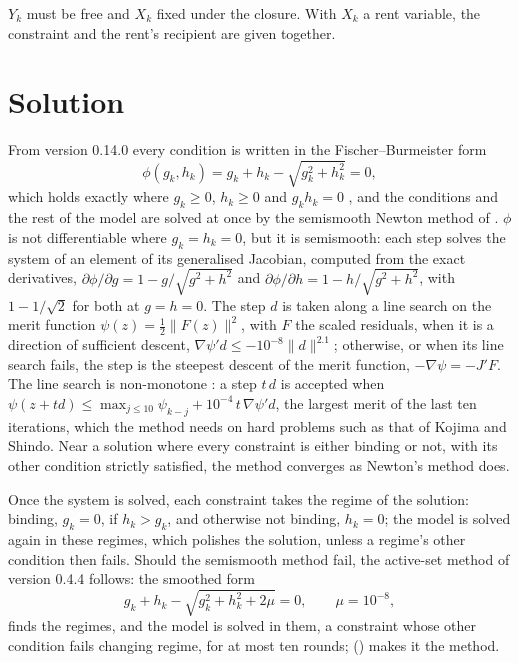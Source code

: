 $Y_k$ must be free and $X_k$ fixed under the closure. With $X_k$ a rent
variable, the constraint and the rent's recipient are given together.

\section{Solution}\label{sec:cons-solution}

From version 0.14.0 every condition is written in the Fischer--Burmeister
form
\begin{equation*}
\phi(g_k, h_k) = g_k + h_k - \sqrt{g_k^2 + h_k^2} = 0,
\end{equation*}
which holds exactly where $g_k \ge 0$, $h_k \ge 0$ and $g_k h_k = 0$
\citep{fischer1992}, and the conditions and the rest of the model are solved
at once by the semismooth Newton method of \citet{deluca1996}. $\phi$ is not
differentiable where $g_k = h_k = 0$, but it is semismooth: each step solves
the system of an element of its generalised Jacobian, computed from the exact
derivatives, $\partial\phi/\partial g = 1 - g/\sqrt{g^2 + h^2}$ and
$\partial\phi/\partial h = 1 - h/\sqrt{g^2 + h^2}$, with $1 - 1/\sqrt{2}$ for
both at $g = h = 0$. The step $d$ is taken along a line search on the merit
function $\psi(z) = \tfrac12 \lVert F(z)\rVert^2$, with $F$ the scaled
residuals, when it is a direction of sufficient descent,
$\nabla\psi' d \le -10^{-8}\lVert d\rVert^{2.1}$; otherwise, or when its line
search fails, the step is the steepest descent of the merit function,
$-\nabla\psi = -J'F$. The line search is non-monotone \citep{grippo1986}: a
step $t\,d$ is accepted when $\psi(z + t d) \le \max_{j \le 10} \psi_{k-j} +
10^{-4}\,t\,\nabla\psi' d$, the largest merit of the last ten iterations,
which the method needs on hard problems such as that of Kojima and Shindo. Near
a solution where every constraint is either binding or not, with its other
condition strictly satisfied, the method converges as Newton's method does.

Once the system is solved, each constraint takes the regime of the solution:
binding, $g_k = 0$, if $h_k > g_k$, and otherwise not binding, $h_k = 0$; the
model is solved again in these regimes, which polishes the solution, unless a
regime's other condition then fails. Should the semismooth method fail, the
active-set method of version 0.4.4 follows: the smoothed form
\begin{equation*}
g_k + h_k - \sqrt{g_k^2 + h_k^2 + 2\mu} = 0, \qquad \mu = 10^{-8},
\end{equation*}
finds the regimes, and the model is solved in them, a constraint whose other
condition fails changing regime, for at most ten rounds;
 () makes it the method.

